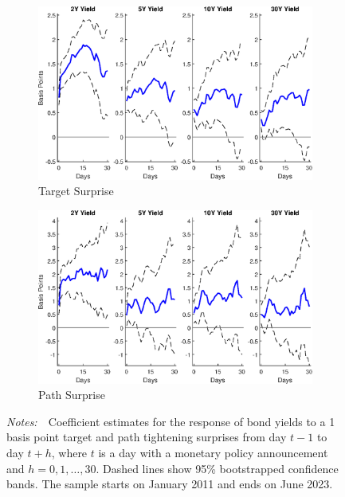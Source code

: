 \documentclass[a4paper, 12pt]{article}
\newcommand{\figtext}[1]{
	\vspace{-1ex}
	\captionsetup{justification=justified,font=footnotesize}
	\caption*{#1}
}
\newcommand{\fignotes}[1]{\figtext{\emph{Notes:~}~#1}}
\providecommand{\lastobsflwbdm}{June 2023}
\providecommand{\idxh}{h}
\begin{document}
\begin{appendices}
	\begin{figure}[tbph]
		\caption{Yield Curve Response to Target and Path Surprises} \label{fig:LPYC}
		\begin{center}
			\begin{minipage}{\linewidth}
				\begin{center}
					\begin{subfigure}[b]{0.475\textwidth}
						\centering
						\includegraphics[height=0.35\textheight,width=\textwidth]{../Figures/Target11YC.eps}
						\caption[]{{\small Target Surprise}} \label{subfig:Target11YC}
					\end{subfigure}
					\hfill
					\begin{subfigure}[b]{0.475\textwidth}  
						\centering 
						\includegraphics[height=0.35\textheight,width=\textwidth]{../Figures/Path11YC.eps}
						\caption[]{{\small Path Surprise}} \label{subfig:Path11YC}
					\end{subfigure}
				\end{center}
				\fignotes{Coefficient estimates for the response of bond yields to a 1 basis point target and path tightening surprises from day \(t - 1\) to day \(t + \idxh\), where \(t\) is a day with a monetary policy announcement and \(\idxh = 0, 1, \ldots, 30\). Dashed lines show 95\% bootstrapped confidence bands. The sample starts on January 2011 and ends on \lastobsflwbdm.}
			\end{minipage} 
		\end{center}
	\end{figure}
	

\end{appendices}
\end{document}
